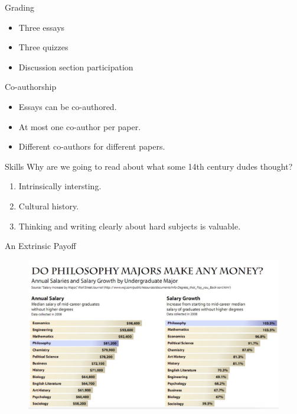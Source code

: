 \documentclass[
  17pt,
  letterpaper,
  ignorenonframetext,
  aspectratio=169,
  handout]{beamer}
\providecommand{\tightlist}{%
  \setlength{\itemsep}{0pt}\setlength{\parskip}{0pt}}\usepackage{longtable,booktabs,array}
\begin{document}
\begin{frame}{Grading}
\protect\hypertarget{grading}{}
\begin{itemize}[<+->]
\tightlist
\item
  Three essays
\item
  Three quizzes
\item
  Discussion section participation
\end{itemize}
\end{frame}

\begin{frame}{Co-authorship}
\protect\hypertarget{co-authorship}{}
\begin{itemize}[<+->]
\tightlist
\item
  Essays can be co-authored.
\item
  At most one co-author per paper.
\item
  Different co-authors for different papers.
\end{itemize}
\end{frame}

\begin{frame}{Skills}
\protect\hypertarget{skills}{}
Why are we going to read about what some 14th century dudes thought?

\begin{enumerate}[<+->]
\tightlist
\item
  Intrinsically intersting.
\item
  Cultural history.
\item
  Thinking and writing clearly about hard subjects is valuable.
\end{enumerate}
\end{frame}

\begin{frame}{An Extrinsic Payoff}
\protect\hypertarget{an-extrinsic-payoff}{}
\begin{figure}

{\centering \includegraphics[width=\textwidth,height=0.7\textheight]{../images/philosophy_pay.jpeg}

}

\caption{~}

\end{figure}
\end{frame}
\end{document}
